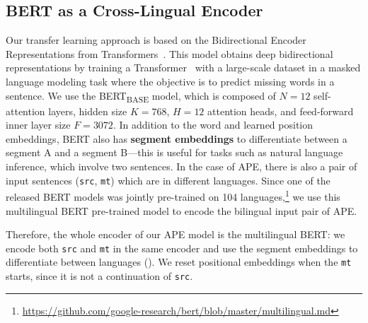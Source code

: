 \subsection{BERT as a Cross-Lingual Encoder}

Our transfer learning approach is based on the Bidirectional Encoder
Representations from Transformers~\citep[BERT;][]{devlin2018bert}.
This model obtains deep bidirectional representations by training a
Transformer~\citep{vaswani2017attention} with a large-scale dataset
in a masked language modeling task where the objective is to predict
missing words in a sentence. We use the BERT\textsubscript{BASE}
model, which is composed of $N=12$ self-attention layers, hidden size
$K=768$, $H=12$ attention heads, and feed-forward inner layer size
$F=3072$. In addition to the word and learned position embeddings,
BERT also has {\bf segment embeddings} to differentiate between a
segment A and a segment B---this is useful for tasks such as natural
language inference, which involve two sentences. In the case of APE,
there is also a pair of input sentences ({\tt src}, {\tt mt}) which
are in different languages. Since one of the released BERT models was
jointly pre-trained on 104 languages,\footnote{
  \url{https://github.com/google-research/bert/blob/master/multilingual.md}}
we use this multilingual BERT pre-trained model to encode the
bilingual input pair of APE.

Therefore, the whole encoder of our APE model is the multilingual
BERT: we encode both {\tt src} and {\tt mt} in the same encoder and
use the segment embeddings to differentiate between languages
(). We reset positional
embeddings when the {\tt mt} starts, since it is not a continuation
of {\tt src}.

